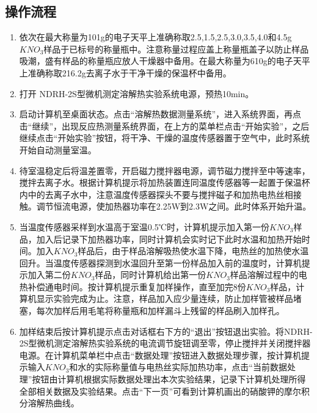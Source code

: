 \documentclass[UTF8]{ctexart}
\begin{document}
\subsection{操作流程}
\begin{enumerate}
    \item 依次在最大称量为101g的电子天平上准确称取2.5,1.5,2.5,3.0,3.5,4.0和4.5g$KNO_3$样品于已标号的称量瓶中。注意称量过程应盖上称量瓶盖子以防止样品吸潮，盛有样品的称量瓶应放人干燥器中备用。在最大称量为610g的电子天平上准确称取216.2g去离子水于干净干燥的保温杯中备用。
    \item 打开 NDRH-2S型微机测定溶解热实验系统电源，预热10min。
    \item 启动计算机至桌面状态。点击“溶解热数据测量系统”，进入系统界面，再点击“继续”，出现反应热测量系统界面，在上方的菜单栏点击“开始实验”，之后继续点击“开始实验”按钮，将干净、干燥的温度传感器置于空气中，此时系统开始自动测量室温。
    \item 待室温稳定后将温差置零，开启磁力搅拌器电源，调节磁力搅拌至中等速率，搅拌去离子水。根据计算机提示将加热装置连同温度传感器等一起置于保温杯内中的去离子水中，注意温度传感器探头不要与搅拌磁子和加热电热丝相接触。调节恒流电源，使加热器功率在2.25W到2.3W之间。此时体系开始升温。
    \item 当温度传感器采样到水温高于室温0.5℃时，计算机提示加入第一份$KNO_3$样品，加入后记录下加热器功率，同时计算机会实时记下此时水温和加热开始时间。加入$KNO_3$样品后，由于样品溶解吸热使水温下降，电热丝的加热使水温回升。当温度传感器探测到水温回升至第一份样品加入前的温度时，计算机提示加入第二份$KNO_3$样品，同时计算机给出第一份$KNO_3$样品溶解过程中的电热补偿通电时间。按计算机提示重复加样操作，直至加完8份$KNO_3$样品，计算机显示实验完成为止。注意，样品加入应少量连续，防止加样管被样品堵塞，每次加样后用毛笔将称量瓶和加样漏斗上残留的样品刷入加样孔。
    \item 加样结束后按计算机提示点击对话框右下方的“退出”按钮退出实验。将NDRH-2S型微机测定溶解热实验系统的电流调节旋钮调至零，停止搅拌并关闭搅拌器电源。在计算机菜单栏中点击“数据处理”按钮进入数据处理步骤，按计算机提示输入$KNO_3$和水的实际称量值与电热丝实际加热功率，点击“当前数据处理”按钮由计算机根据实际数据处理出本次实验结果，记录下计算机处理所得全部相关数据及实验结果。点击“下一页”可看到计算机画出的硝酸钾的摩尔积分溶解热曲线。
\end{enumerate}
\newpage
\end{document}
